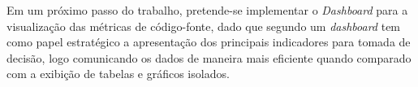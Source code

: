 Em um próximo passo do trabalho, pretende-se implementar o \textit{Dashboard} para a visualização das métricas de código-fonte, dado que segundo  um \textit{dashboard} tem como papel estratégico a apresentação dos principais indicadores para tomada de decisão, logo comunicando os dados de maneira mais eficiente quando comparado com a exibição de tabelas e gráficos isolados.


